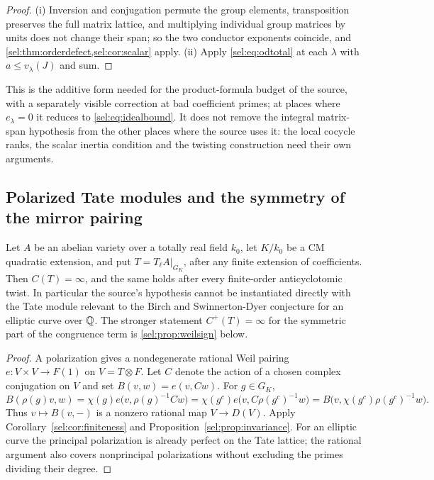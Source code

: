 \begin{proof}
(i) Inversion and conjugation permute the group elements, transposition
preserves the full matrix lattice, and multiplying individual group matrices
by units does not change their span; so the two conductor exponents
coincide, and \cref{sel:thm:orderdefect,sel:cor:scalar} apply. (ii) Apply
\eqref{sel:eq:odtotal} at each $\lambda$ with $a\le v_\lambda(J)$ and sum.
\end{proof}

This is the additive form needed for the product-formula budget of the
source, with a separately visible correction at bad coefficient primes; at
places where $e_\lambda=0$ it reduces to \eqref{sel:eq:idealbound}. It does not
remove the integral matrix-span hypothesis from the other places where the
source uses it: the local cocycle ranks, the scalar inertia condition and
the twisting construction need their own arguments.

\subsection{Polarized Tate modules and the symmetry of the mirror pairing}\label{sel:sec:mirror}

\begin{corollary}\label{sel:cor:polarized}
Let $A$ be an abelian variety over a totally real field $k_0$, let $K/k_0$
be a CM quadratic extension, and put $T=T_\ell A|_{G_K}$, after any finite
extension of coefficients. Then $C(T)=\infty$, and the same holds after
every finite-order anticyclotomic twist. In particular the source's
 hypothesis cannot be instantiated directly with the Tate
module relevant to the Birch and Swinnerton-Dyer conjecture for an elliptic
curve over $\mathbb{Q}$. The stronger statement $C^+(T)=\infty$ for the symmetric part
of the congruence term is \cref{sel:prop:weilsign} below.
\end{corollary}

\begin{proof}
A polarization gives a nondegenerate rational Weil
pairing~\cite{Milne2008Abelian} $e\colon V\times V\to F(1)$ on
$V=T\otimes F$. Let $C$ denote the action of a chosen complex conjugation on
$V$ and set $B(v,w)=e(v,Cw)$. For $g\in G_K$,
\[
 B(\rho(g)v,w)=\chi(g)e\bigl(v,\rho(g)^{-1}Cw\bigr)
 =\chi(g^c)e\bigl(v,C\rho(g^c)^{-1}w\bigr)
 =B\bigl(v,\chi(g^c)\rho(g^c)^{-1}w\bigr).
\]
Thus $v\mapsto B(v,-)$ is a nonzero rational map $V\to D(V)$. Apply
Corollary~\ref{sel:cor:finiteness} and Proposition~\ref{sel:prop:invariance}. For an elliptic
curve the principal polarization is already perfect on the Tate lattice;
the rational argument also covers nonprincipal polarizations without
excluding the primes dividing their degree.
\end{proof}

